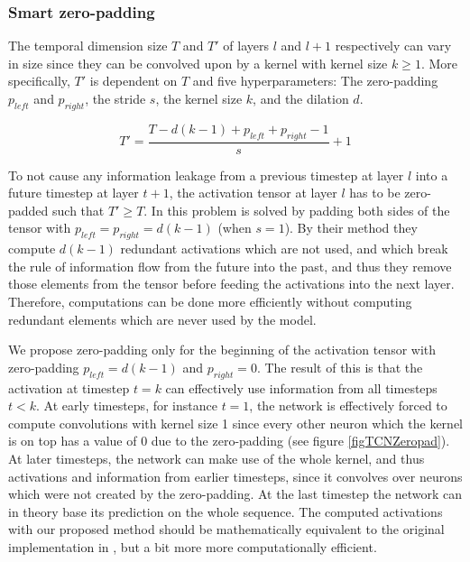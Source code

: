\documentclass[a4paper, twoside]{article}
\begin{document}
\subsubsection{Smart zero-padding}
The temporal dimension size $T$ and $T'$ of layers $l$ and $l+1$ respectively can vary in size since they can be convolved upon by a kernel with kernel size $k \geq 1$. More specifically, $T'$ is dependent on $T$ and five hyperparameters: The zero-padding $p_{left}$ and $p_{right}$, the stride $s$, the kernel size $k$, and the dilation $d$.

\begin{equation}
T' = \frac{T-d(k-1)+p_{left}+p_{right}-1}{s}+1
\end{equation}

To not cause any information leakage from a previous timestep at layer $l$ into a future timestep at layer $t+1$, the activation tensor at layer $l$ has to be zero-padded such that $T' \geq T$. In \cite{tcn} this problem is solved by padding both sides of the tensor with $p_{left} = p_{right} = d(k-1)$ (when $s=1$). By their method they compute $d(k-1)$ redundant activations which are not used, and which break the rule of information flow from the future into the past, and thus they remove those elements from the tensor before feeding the activations into the next layer. Therefore, computations can be done more efficiently without computing redundant elements which are never used by the model.

We propose zero-padding only for the beginning of the activation tensor with zero-padding $p_{left} = d(k-1)$ and $p_{right} = 0$. The result of this is that the activation at timestep $t=k$ can effectively use information from all timesteps $t<k$. At early timesteps, for instance $t=1$, the network is effectively forced to compute convolutions with kernel size 1 since every other neuron which the kernel is on top has a value of 0 due to the zero-padding (see figure \ref{figTCNZeropad}). At later timesteps, the network can make use of the whole kernel, and thus activations and information from earlier timesteps, since it convolves over neurons which were not created by the zero-padding. At the last timestep the network can in theory base its prediction on the whole sequence. The computed activations with our proposed method should be mathematically equivalent to the original implementation in \cite{tcn}, but a bit more more computationally efficient.
\end{document}
